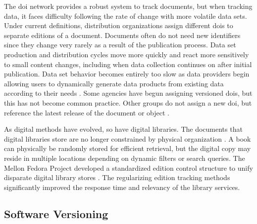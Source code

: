 The \gls{doi} network provides a robust system to track documents, but when tracking data, it faces difficulty following the rate of change with more volatile data sets.
Under current definitions, distribution organizations assign different \glspl{doi} to separate editions of a document.
Documents often do not need new identifiers since they change very rarely as a result of the publication process.
Data set production and distribution cycles move more quickly and react more sensitively to small content changes, including when data collection continues on after initial publication.
Data set behavior becomes entirely too slow as data providers begin allowing users to dynamically generate data products from existing data according to their needs \cite{Barkstrom2003a}.
Some agencies have begun assigning versioned \glspl{doi}, but this has not become common practice.
Other groups do not assign a new \gls{doi}, but reference the latest release of the document or object \cite{Ands2017}.

As digital methods have evolved, so have digital libraries.
The documents that digital libraries store are no longer constrained by physical organization \cite{Barkstrom_digitallibrary}.
A book can physically be randomly stored for efficient retrieval, but the digital copy may reside in multiple locations depending on dynamic filters or search queries.
The Mellon Fedora Project developed a standardized edition control structure to unify disparate digital library stores \cite{Payette2002}.
The regularizing edition tracking methods significantly improved the response time and relevancy of the library services.

\subsection{Software Versioning}

